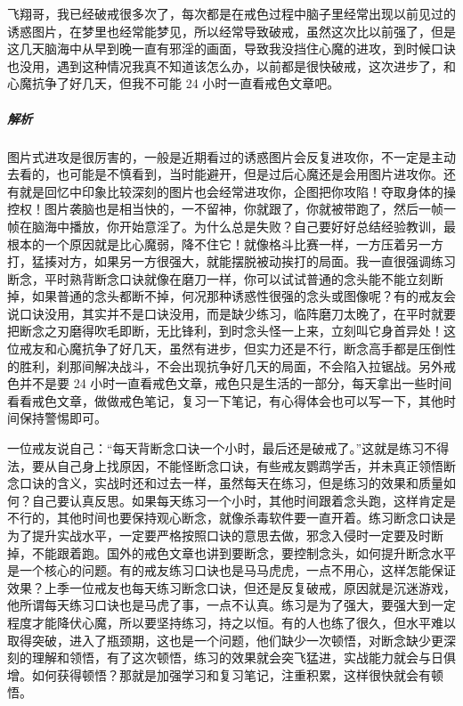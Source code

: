 \begin{case}[不是口诀没用]
    飞翔哥，我已经破戒很多次了，每次都是在戒色过程中脑子里经常出现以前见过的诱惑图片，在梦里也经常能梦见，所以经常导致破戒，虽然这次比以前强了，但是这几天脑海中从早到晚一直有邪淫的画面，导致我没挡住心魔的进攻，到时候口诀也没用，遇到这种情况我真不知道该怎么办，以前都是很快破戒，这次进步了，和心魔抗争了好几天，但我不可能 24 小时一直看戒色文章吧。
    \subparagraph{解析} 图片式进攻是很厉害的，一般是近期看过的诱惑图片会反复进攻你，不一定是主动去看的，也可能是不慎看到，当时能避开，但是过后心魔还是会用图片进攻你。还有就是回忆中印象比较深刻的图片也会经常进攻你，企图把你攻陷！夺取身体的操控权！图片袭脑也是相当快的，一不留神，你就跟了，你就被带跑了，然后一帧一帧在脑海中播放，你开始意淫了。为什么总是失败？自己要好好总结经验教训，最根本的一个原因就是比心魔弱，降不住它！就像格斗比赛一样，一方压着另一方打，猛揍对方，如果另一方很强大，就能摆脱被动挨打的局面。我一直很强调练习断念，平时熟背断念口诀就像在磨刀一样，你可以试试普通的念头能不能立刻断掉，如果普通的念头都断不掉，何况那种诱惑性很强的念头或图像呢？有的戒友会说口诀没用，其实并不是口诀没用，而是缺少练习，临阵磨刀太晚了，在平时就要把断念之刃磨得吹毛即断，无比锋利，到时念头怪一上来，立刻叫它身首异处！这位戒友和心魔抗争了好几天，虽然有进步，但实力还是不行，断念高手都是压倒性的胜利，刹那间解决战斗，不会出现抗争好几天的局面，不会陷入拉锯战。另外戒色并不是要 24 小时一直看戒色文章，戒色只是生活的一部分，每天拿出一些时间看看戒色文章，做做戒色笔记，复习一下笔记，有心得体会也可以写一下，其他时间保持警惕即可。

    一位戒友说自己：“每天背断念口诀一个小时，最后还是破戒了。”这就是练习不得法，要从自己身上找原因，不能怪断念口诀，有些戒友鹦鹉学舌，并未真正领悟断念口诀的含义，实战时还和过去一样，虽然每天在练习，但是练习的效果和质量如何？自己要认真反思。如果每天练习一个小时，其他时间跟着念头跑，这样肯定是不行的，其他时间也要保持观心断念，就像杀毒软件要一直开着。练习断念口诀是为了提升实战水平，一定要严格按照口诀的意思去做，邪念入侵时一定要及时断掉，不能跟着跑。国外的戒色文章也讲到要断念，要控制念头，如何提升断念水平是一个核心的问题。有的戒友练习口诀也是马马虎虎，一点不用心，这样怎能保证效果？上季一位戒友也每天练习断念口诀，但还是反复破戒，原因就是沉迷游戏，他所谓每天练习口诀也是马虎了事，一点不认真。练习是为了强大，要强大到一定程度才能降伏心魔，所以要坚持练习，持之以恒。有的人也练了很久，但水平难以取得突破，进入了瓶颈期，这也是一个问题，他们缺少一次顿悟，对断念缺少更深刻的理解和领悟，有了这次顿悟，练习的效果就会突飞猛进，实战能力就会与日俱增。如何获得顿悟？那就是加强学习和复习笔记，注重积累，这样很快就会有顿悟。


\end{case}
